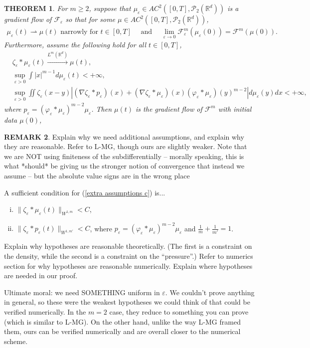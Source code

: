 \documentclass[11pt,leqno]{amsart}
\newtheorem{thm}{THEOREM}[section]
\theoremstyle{definition}
\newtheorem{remark}[thm]{REMARK}
\newcommand{\R}{{\mathord{\mathbb R}}}
\newcommand{\Rd}{{\mathord{\mathbb R}^d}}
\newcommand{\wto}{\rightharpoonup}
\newcommand{\F}{\mathcal{F}}
\def\P{{\mathcal P}}
\def\e{\varepsilon}
\def\F{\mathcal{F}}
\begin{document}
\begin{thm}
For $m \geq 2$, suppose that $\mu_\e \in AC^2([0,T],\P_2(\R^d))$ is a gradient flow of $\F_\e$ so that for some $\mu \in AC^2([0,T],\P_2(\R^d))$,
\begin{align}   \mu_\e(t) \wto \mu(t) \text{ narrowly for }t \in [0,T] \quad \text{ and } \quad
 \lim_{\e \to 0} \F^m_\e(\mu_\e(0)) = \F^m(\mu(0)) .
\end{align}
Furthermore, assume the following hold for all $t \in [0,T]$,
\begin{align} \label{extra assumptions a}
 &\zeta_\e*\mu_\e(t) \xrightarrow{L^m(\Rd)} \mu(t) , \\
 &\sup_{\e >0} \int |x|^{m-1}d \mu_\e(t) <+\infty ,  \label{extra assumptions b}\\
 &\sup_{\e >0} \iint  \zeta_\e(x-y) \left| (\nabla \zeta_\e * p_\e)(x)  + (\nabla \zeta_\e * \mu_\e) (x) (\varphi_\e*\mu_\e)(y)^{m-2} \right|d\mu_\e(y) dx < +\infty , \label{extra assumptions c}
\end{align}
where $p_\e = (\varphi_\e *\mu_\e)^{m-2} \mu_\e$. Then $\mu(t)$ is the gradient flow of $\mathcal{F}^m$ with initial data $\mu(0)$, 
\end{thm}

\begin{remark}
{\color{Aquamarine}  Explain why we need additional assumptions, and explain why they are reasonable. Refer to L-MG, though ours are slightly weaker.} {\color{Aquamarine} Note that we are NOT using finiteness of the subdifferentially -- morally speaking, this is what *should* be giving us the stronger notion of convergence that instead we assume -- but the absolute value signs are in the wrong place }

{\color{Aquamarine} A sufficient condition for (\ref{extra assumptions c}) is...
\begin{enumerate}[(i)]
\item $\|\zeta_\e*\mu_\e(t) \|_{W^{1,m}} < C$, \label{H1i}
\item $\|\zeta_\e*p_\e(t) \|_{W^{1,m'}} < C $, where $p_\e = (\varphi_\e *\mu_\e)^{m-2} \mu_\e$ and $\frac{1}{m} + \frac{1}{m'} = 1$.
\end{enumerate}
 Explain why hypotheses are reasonable theoretically. (The first is a constraint on the density, while the second is a constraint on the ``pressure''.) Refer to numerics section for why hypotheses are reasonable numerically. Explain where hypotheses are needed in our proof. 

Ultimate moral: we need SOMETHING uniform in $\e$. We couldn't prove anything in general, so these were the weakest hypotheses we could think of that could be verified numerically. In the $m=2$ case, they reduce to something you can prove (which is similar to L-MG). On the other hand, unlike the way L-MG framed them, ours can be verified numerically and are overall closer to the numerical scheme.}
\end{remark}
\end{document}
